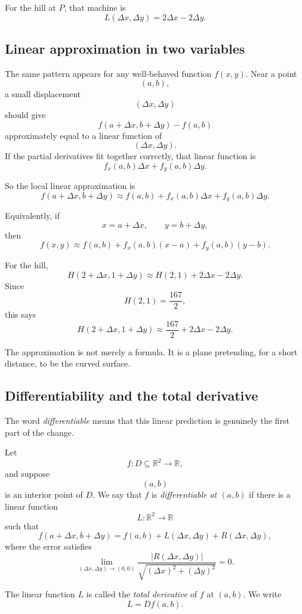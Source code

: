 For the hill at \(P\), that machine is
\[
    L(\Delta x,\Delta y)=2\Delta x-2\Delta y.
\]

\subsection{Linear approximation in two variables}

The same pattern appears for any well-behaved function \(f(x,y)\).  Near a point
\[
    (a,b),
\]
a small displacement
\[
    (\Delta x,\Delta y)
\]
should give
\[
    f(a+\Delta x,b+\Delta y)-f(a,b)
\]
approximately equal to a linear function of
\[
    (\Delta x,\Delta y).
\]
If the partial derivatives fit together correctly, that linear function is
\[
    f_x(a,b)\Delta x+f_y(a,b)\Delta y.
\]

So the local linear approximation is
\[
\boxed{
    f(a+\Delta x,b+\Delta y)
    \approx
    f(a,b)+f_x(a,b)\Delta x+f_y(a,b)\Delta y.
}
\]

Equivalently, if
\[
    x=a+\Delta x,
    \qquad
    y=b+\Delta y,
\]
then
\[
\boxed{
    f(x,y)
    \approx
    f(a,b)+f_x(a,b)(x-a)+f_y(a,b)(y-b).
}
\]

For the hill,
\[
    H(2+\Delta x,1+\Delta y)
    \approx
    H(2,1)+2\Delta x-2\Delta y.
\]
Since
\[
    H(2,1)=\frac{167}{2},
\]
this says
\[
    H(2+\Delta x,1+\Delta y)
    \approx
    \frac{167}{2}+2\Delta x-2\Delta y.
\]

The approximation is not merely a formula.  It is a plane pretending, for a short
distance, to be the curved surface.

\subsection{Differentiability and the total derivative}

The word \emph{differentiable} means that this linear prediction is genuinely the first
part of the change.

\begin{definition}
Let
\[
    f:D\subseteq\mathbb R^2\to\mathbb R,
\]
and suppose
\[
    (a,b)
\]
is an interior point of \(D\).  We say that \(f\) is \emph{differentiable at \((a,b)\)} if
there is a linear function
\[
    L:\mathbb R^2\to\mathbb R
\]
such that
\[
\boxed{
    f(a+\Delta x,b+\Delta y)
    =
    f(a,b)+L(\Delta x,\Delta y)+R(\Delta x,\Delta y),
}
\]
where the error satisfies
\[
\boxed{
    \lim_{(\Delta x,\Delta y)\to(0,0)}
    \frac{|R(\Delta x,\Delta y)|}
    {\sqrt{(\Delta x)^2+(\Delta y)^2}}
    =
    0.
}
\]

The linear function \(L\) is called the \emph{total derivative} of \(f\) at \((a,b)\).  We
write
\[
    L=Df(a,b).
\]
\end{definition}

